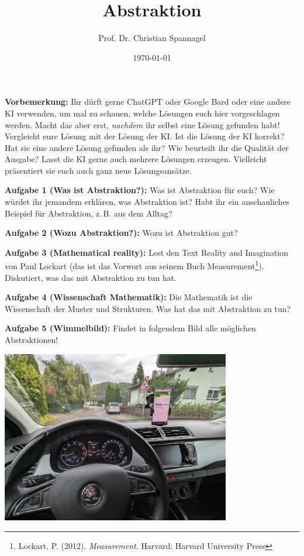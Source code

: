 \documentclass{../cssheet}
\title{Abstraktion}
\author{Prof. Dr. Christian Spannagel}
\date{\today}
\begin{document}
\printtitle

\textbf{Vorbemerkung:}  Ihr dürft gerne ChatGPT oder Google Bard oder eine andere KI verwenden, um mal zu schauen, welche Lösungen euch hier vorgeschlagen werden. Macht das aber erst, \emph{nachdem} ihr selbst eine Lösung gefunden habt! Vergleicht eure Lösung mit der Lösung der KI. Ist die Lösung der KI korrekt? Hat sie eine andere Lösung gefunden als ihr? Wie beurteilt ihr die Qualität der Ausgabe? Lasst die KI gerne auch mehrere Lösungen erzeugen. Vielleicht präsentiert sie euch auch ganz neue Lösungsansätze. 

\textbf{Aufgabe 1 (Was ist Abstraktion?):}  Was ist Abstraktion für euch? Wie würdet ihr jemandem erklären, was Abstraktion ist? Habt ihr ein anschauliches Beispiel für Abstraktion, z.\,B. aus dem Alltag?

\textbf{Aufgabe 2 (Wozu Abstraktion?):} Wozu ist Abstraktion gut?

\textbf{Aufgabe 3 (Mathematical reality):} Lest den Text \glqq{}Reality and Imagination\grqq{} von Paul Lockart (das ist das Vorwort aus seinem Buch \glqq{}Measurement\grqq{}\footnote{Lockart, P. (2012). \emph{Measurement}. Harvard: Harvard University Press}). Diskutiert, was das mit Abstraktion zu tun hat.

\textbf{Aufgabe 4 (Wissenschaft Mathematik):} Die Mathematik ist die Wissenschaft der Muster und Strukturen. Was hat das mit Abstraktion zu tun?

\textbf{Aufgabe 5 (Wimmelbild):} Findet in folgendem Bild alle möglichen Abstraktionen!

\begin{center}
\includegraphics[width=10cm]{cockpit.jpg}
\end{center}


\printlicense

\printsocials
\end{document}
